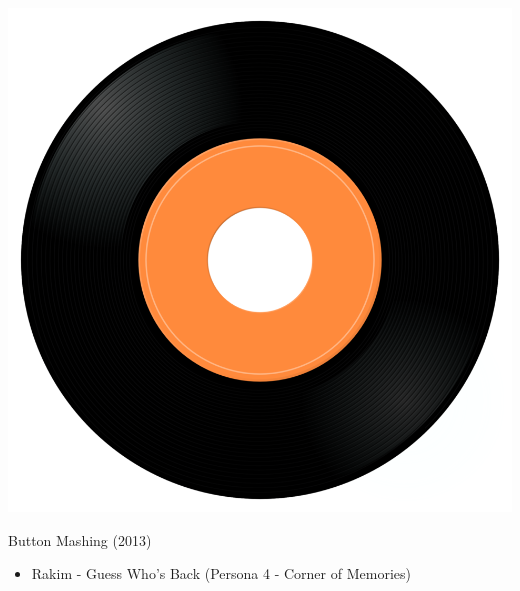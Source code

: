 \begin{minipage}[t]{0.25\textwidth}\vspace{0pt}
	\captionsetup{type=figure}
	\includegraphics[width=\textwidth]{Images/cover.png}
	\caption*{Button Mashing (2013)}
\end{minipage}
\begin{minipage}[t]{0.25\textwidth}\vspace{0pt}
	\begin{itemize}[nosep,leftmargin=1em,labelwidth=*,align=left]
		\setlength{\itemsep}{0pt}
		\item Rakim - Guess Who's Back (Persona 4 - Corner of Memories)
	\end{itemize}
\end{minipage}
